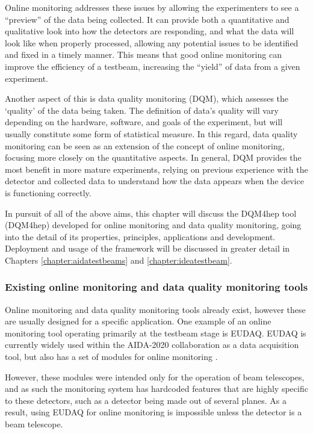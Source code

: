 Online monitoring addresses these issues by allowing the experimenters to see a ``preview'' of the data being collected. It can provide both a quantitative and qualitative look into how the detectors are responding, and what the data will look like when properly processed, allowing any potential issues to be identified and fixed in a timely manner. This means that good online monitoring can improve the efficiency of a testbeam, increasing the ``yield'' of data from a given experiment.

Another aspect of this is data quality monitoring (\acrshort{DQM}), which assesses the `quality' of the data being taken. The definition of data's quality will vary depending on the hardware, software, and goals of the experiment, but will usually constitute some form of statistical measure. In this regard, data quality monitoring can be seen as an extension of the concept of online monitoring, focusing more closely on the quantitative aspects. In general, \acrshort{DQM} provides the most benefit in more mature experiments, relying on previous experience with the detector and collected data to understand how the data appears when the device is functioning correctly.  

In pursuit of all of the above aims, this chapter will discuss the \acrlong{DQM4hep} tool (\acrshort{DQM4hep}) developed for online monitoring and data quality monitoring, going into the detail of its properties, principles, applications and development. Deployment and usage of the framework will be discussed in greater detail in Chapters \ref{chapter:aidatestbeams} and \ref{chapter:ideatestbeam}.

\subsubsection{Existing online monitoring and data quality monitoring tools} 
Online monitoring and data quality monitoring tools already exist, however these are usually designed for a specific application. One example of an online monitoring tool operating primarily at the testbeam stage is \acrfull{EUDAQ}. \acrshort{EUDAQ} is currently widely used within the \acrshort{AIDA}-2020 collaboration as a data acquisition tool, but also has a set of modules for online monitoring \cite{eudaq-manual}.

However, these modules were intended only for the operation of beam telescopes, and as such the monitoring system has hardcoded features that are highly specific to these detectors, such as a detector being made out of several planes. As a result, using \acrshort{EUDAQ} for online monitoring is impossible unless the detector is a beam telescope. 

